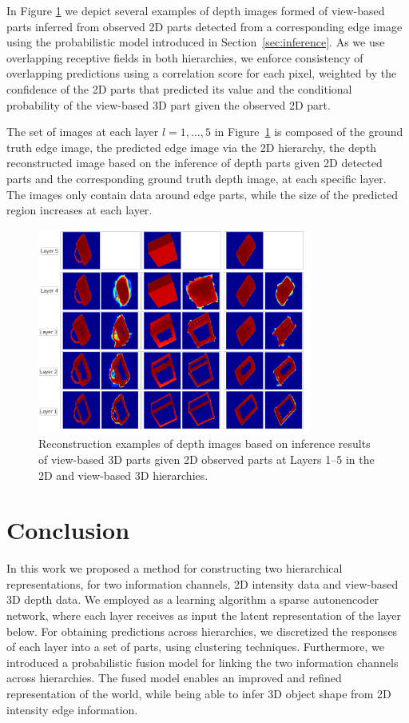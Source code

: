 \documentclass[runningheads]{llncs}
\begin{document}
In Figure \ref{inference} we depict several examples of depth images formed of view-based parts inferred from observed 2D parts detected from a corresponding edge image using the probabilistic model introduced in Section~\ref{sec:inference}. As we use overlapping receptive fields in both hierarchies, we enforce consistency of overlapping predictions using a correlation score for each pixel, weighted by the confidence of the 2D parts that predicted its value and the conditional probability of the view-based 3D part given the observed 2D part. 

The set of images at each layer $l=1,\ldots,5$ in Figure~\ref{inference} is composed of the ground truth edge image, the predicted edge image via the 2D hierarchy, the depth reconstructed image based on the inference of depth parts given 2D detected parts and the corresponding ground truth depth image, at each specific layer. The images only contain data around edge parts, while the size of the predicted region increases at each layer.

\begin{figure}
\begin{center}
\includegraphics[width=0.8\textwidth]{inference}
\end{center}
\caption{Reconstruction examples of depth images based on inference results of view-based 3D parts given 2D observed parts at Layers 1--5 in the 2D and view-based 3D hierarchies.}
\label{inference}
\end{figure}

\section{Conclusion}
\label{sec:conclusions}

In this work we proposed a method for constructing two hierarchical representations, for two information channels, 2D intensity data and view-based 3D depth data. We employed as a learning algorithm a sparse autonencoder network, where each layer receives as input the latent representation of the layer below. For obtaining predictions across hierarchies, we discretized the responses of each layer into a set of parts, using clustering techniques. Furthermore, we introduced a probabilistic fusion model for linking the two information channels across hierarchies. The fused model enables an improved and refined representation of the world, while being able to infer 3D object shape from 2D intensity edge information.
\end{document}
